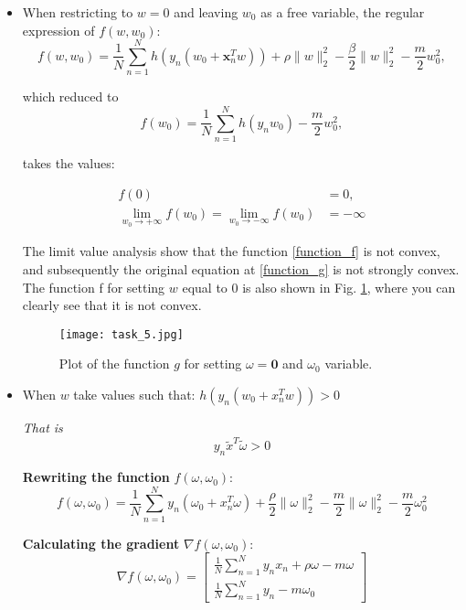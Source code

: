 \documentclass[a4paper,12pt]{report}
\begin{document}
\begin{itemize}
    \item When restricting to $w = 0$ and leaving $w_0$ as a free variable, the regular expression of $f(w, w_0)$:
    \begin{equation}
    f(w, w_0) = \frac{1}{N} \sum_{n=1}^{N} h\left(y_n\left(w_0 + \mathbf{x}_n^T w\right)\right) + \rho \|w\|_2^2 - \frac{\beta}{2} \|w\|_2^2 - \frac{m}{2}w_0^2,
    \label{function_f}
    \end{equation}
    
    which reduced to
    \begin{equation}
    f(w_0) = \frac{1}{N} \sum_{n=1}^{N} h\left(y_n w_0\right) - \frac{m}{2}w_0^2,
    \end{equation}

    takes the values:
    
    \begin{align}
        f(0) &= 0, \\
        \lim_{w_0 \to +\infty} f(w_0) = \lim_{w_0 \to -\infty} f(w_0) &= -\infty
    \end{align}

    The limit value analysis show that the function \eqref{function_f} is not convex, and subsequently the original equation at \eqref{function_g} is not strongly convex. The function f for setting $w$ equal to 0 is also shown in Fig. \ref{disprove_scvx}, where you can clearly see that it is not convex.
    \begin{figure}[h!]
    \centering
        \texttt{[image: task\_5.jpg]}
        \caption{Plot of the function $g$ for setting $\omega = \mathbf{0}$ and $\omega_0$ variable.}
        \label{disprove_scvx}
\end{figure}
    
    \item When $w$ take values such that: $h(y_n(w_0+x_n^Tw)) > 0$
    
\textit{That is} \[
y_n \tilde{x}^T \tilde{\omega} > 0
\]

\textbf{Rewriting the function} \( f(\omega, \omega_0) \):
\begin{equation}
f(\omega, \omega_0) = \frac{1}{N} \sum_{n=1}^{N} y_n (\omega_0 + x_n^T \omega) + \frac{\rho}{2} \|\omega\|_2^2 -\frac{m}{2}\|\omega\|_2^2 - \frac{m}{2} \omega_0^2
\end{equation}

\textbf{Calculating the gradient} \( \nabla f(\omega, \omega_0) \):
\begin{equation}
\nabla f(\omega, \omega_0) = 
\begin{bmatrix}
\frac{1}{N}{\sum_{n=1}^{N} y_n x_n + \rho \omega - m \omega} \\[5pt]
\frac{1}{N} \sum_{n=1}^{N} y_n - m \omega_0
\end{bmatrix}
\end{equation}



\end{itemize}
\end{document}
